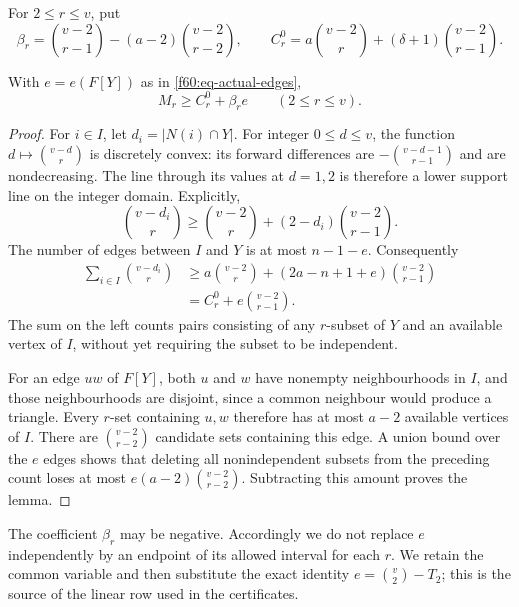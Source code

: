 For $2\le r\le v$, put
\begin{equation}
 \beta_r=\binom{v-2}{r-1}-(a-2)\binom{v-2}{r-2},\qquad
 C_r^0=a\binom{v-2}{r}+(\delta+1)\binom{v-2}{r-1}.
 \label{f60:eq-mean-constants}
\end{equation}

\begin{lemma}
\label{f60:lem-mean}
With $e=e(F[Y])$ as in \eqref{f60:eq-actual-edges},
\begin{equation}
 M_r\ge C_r^0+\beta_r e\qquad(2\le r\le v).
 \label{f60:eq-mean}
\end{equation}
\end{lemma}

\begin{proof}
For $i\in I$, let $d_i=|N(i)\cap Y|$.  For integer $0\le d\le v$,
the function $d\mapsto\binom{v-d}{r}$ is discretely convex: its forward
differences are $-\binom{v-d-1}{r-1}$ and are nondecreasing.  The line
through its values at $d=1,2$ is therefore a lower support line on the
integer domain.  Explicitly,
\[
 \binom{v-d_i}{r}\ge
 \binom{v-2}{r}+(2-d_i)\binom{v-2}{r-1}.
\]
The number of edges between $I$ and $Y$ is at most $n-1-e$.
Consequently
\begin{align*}
 \sum_{i\in I}\binom{v-d_i}{r}
 &\ge a\binom{v-2}{r}
   +(2a-n+1+e)\binom{v-2}{r-1}\\
 &=C_r^0+e\binom{v-2}{r-1}.
\end{align*}
The sum on the left counts pairs consisting of any $r$-subset of $Y$
and an available vertex of $I$, without yet requiring the subset to be
independent.

For an edge $uw$ of $F[Y]$, both $u$ and $w$ have nonempty
neighbourhoods in $I$, and those neighbourhoods are disjoint, since a
common neighbour would produce a triangle.  Every $r$-set containing
$u,w$ therefore has at most $a-2$ available vertices of $I$.  There are
$\binom{v-2}{r-2}$ candidate sets containing this edge.  A union bound
over the $e$ edges shows that deleting all nonindependent subsets from
the preceding count loses at most
$e(a-2)\binom{v-2}{r-2}$.  Subtracting this amount proves the lemma.
\end{proof}

The coefficient $\beta_r$ may be negative.  Accordingly we do not
replace $e$ independently by an endpoint of its allowed interval for
each $r$.  We retain the common variable and then substitute the exact
identity $e=\binom v2-T_2$; this is the source of the linear row used in
the certificates.

